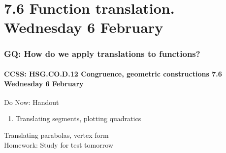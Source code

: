 \documentclass{beamer}
\begin{document}
  \section{7.6 Function translation. Wednesday 6 February}
    \frame
    {
      \frametitle{GQ: How do we apply translations to functions?}
      \framesubtitle{CCSS: HSG.CO.D.12 Congruence, geometric constructions \hfill \alert{7.6 Wednesday 6 February}}

      \begin{block}{Do Now: Handout}
        \begin{enumerate}
          \item Translating segments, plotting quadratics
        \end{enumerate}
      \end{block}
      Translating parabolas, vertex form\\[0.5cm]
      Homework: Study for \alert{test tomorrow}
    }
\end{document}
